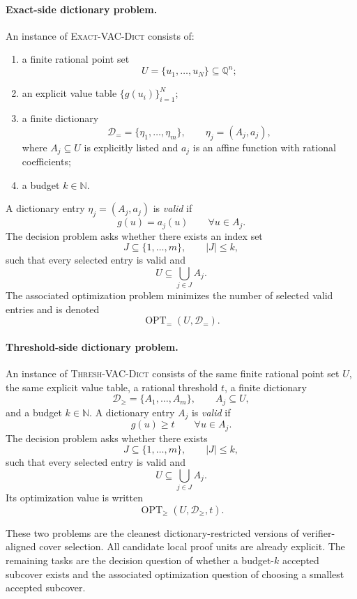 \paragraph{Exact-side dictionary problem.}
An instance of \textsc{Exact-VAC-Dict} consists of:
\begin{enumerate}
    \item a finite rational point set
    \[
    U=\{u_1,\dots,u_N\}\subseteq \mathbb Q^n;
    \]
    \item an explicit value table $\{g(u_i)\}_{i=1}^N$;
    \item a finite dictionary
    \[
    \mathcal D_{=} = \{\eta_1,\dots,\eta_m\},
    \qquad
    \eta_j=(A_j,a_j),
    \]
    where $A_j\subseteq U$ is explicitly listed and $a_j$ is an affine function with rational coefficients;
    \item a budget $k\in\mathbb N$.
\end{enumerate}
A dictionary entry $\eta_j=(A_j,a_j)$ is \emph{valid} if
\[
g(u)=a_j(u)
\qquad \forall u\in A_j.
\]
The decision problem asks whether there exists an index set
\[
J\subseteq \{1,\dots,m\},
\qquad
|J|\le k,
\]
such that every selected entry is valid and
\[
U\subseteq \bigcup_{j\in J} A_j.
\]
The associated optimization problem minimizes the number of selected valid entries and is denoted
\[
\operatorname{OPT}_{=}(U,\mathcal D_{=}).
\]

\paragraph{Threshold-side dictionary problem.}
An instance of \textsc{Thresh-VAC-Dict} consists of the same finite rational point set $U$, the same explicit value table, a rational threshold $t$, a finite dictionary
\[
\mathcal D_{\ge}=\{A_1,\dots,A_m\},
\qquad
A_j\subseteq U,
\]
and a budget $k\in\mathbb N$. A dictionary entry $A_j$ is \emph{valid} if
\[
g(u)\ge t
\qquad \forall u\in A_j.
\]
The decision problem asks whether there exists
\[
J\subseteq \{1,\dots,m\},
\qquad
|J|\le k,
\]
such that every selected entry is valid and
\[
U\subseteq \bigcup_{j\in J} A_j.
\]
Its optimization value is written
\[
\operatorname{OPT}_{\ge}(U,\mathcal D_{\ge},t).
\]

These two problems are the cleanest dictionary-restricted versions of verifier-aligned cover selection. All candidate local proof units are already explicit. The remaining tasks are the decision question of whether a budget-$k$ accepted subcover exists and the associated optimization question of choosing a smallest accepted subcover.

